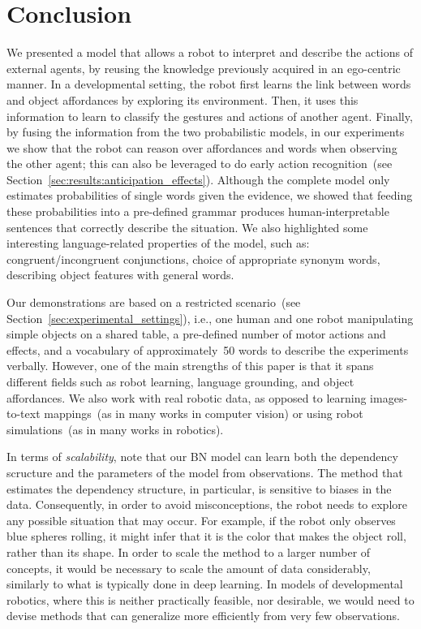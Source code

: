 
\section{Conclusion}
\label{sec:conclusions}

We presented a model that allows a robot to interpret and describe the actions of external agents, by reusing the knowledge previously acquired in an ego-centric manner.
In a developmental setting, the robot first learns the link between words and object affordances by exploring its environment.
Then, it uses this information to learn to classify the gestures and actions of another agent.
Finally, by fusing the information from the two probabilistic models, in our experiments we show that the robot can reason over affordances and words when observing the other agent; this can also be leveraged to do early action recognition~(see Section~\ref{sec:results:anticipation_effects}).
Although the complete model only estimates probabilities of single words given the evidence, we showed that feeding these probabilities into a pre-defined grammar produces human-interpretable sentences that correctly describe the situation.
We also highlighted some interesting language-related properties of the model, such as:
congruent/incongruent conjunctions,
choice of appropriate synonym words,
describing object features with general words.

Our demonstrations are based on a restricted scenario~(see Section~\ref{sec:experimental_settings}), i.e., one human and one robot manipulating simple objects on a shared table, a pre-defined number of motor actions and effects, and a vocabulary of approximately~50 words to describe the experiments verbally.
However, one of the main strengths of this paper is that it spans different fields such as robot learning, language grounding, and object affordances.
We also work with real robotic data, as opposed to learning images-to-text mappings~(as in many works in computer vision) or using robot simulations~(as in many works in robotics).

In terms of \emph{scalability}, note that our \ac{BN} model can learn both the dependency scructure and the parameters of the model from observations.
The method that estimates the dependency structure, in particular, is sensitive to biases in the data.
Consequently, in order to avoid misconceptions, the robot needs to explore any possible situation that may occur.
For example, if the robot only observes blue spheres rolling, it might infer that it is the color that makes the object roll, rather than its shape.
In order to scale the method to a larger number of concepts, it would be necessary to scale the amount of data considerably, similarly to what is typically done in deep learning.
In models of developmental robotics, where this is neither practically feasible, nor desirable, we would need to devise methods that can generalize more efficiently from very few observations.


